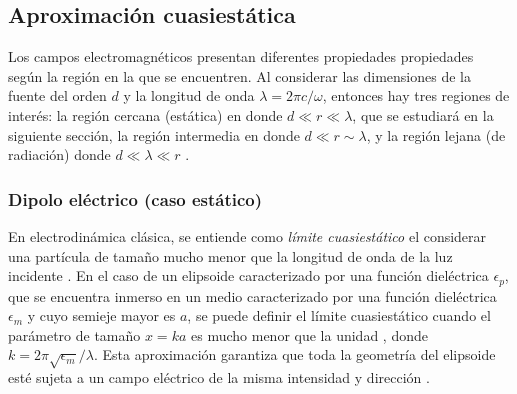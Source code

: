 \subsection{Aproximación cuasiestática}
Los campos electromagnéticos presentan diferentes propiedades propiedades según la región en la que se encuentren. Al considerar las dimensiones de la fuente  del orden $d$ y la longitud de onda $\lambda=2\pi c/\omega$, entonces hay tres regiones de interés: la región cercana (estática) en donde $d\ll r\ll\lambda$, que se estudiará en la siguiente sección, la región intermedia en donde $d\ll r\sim \lambda$, y la región lejana (de radiación) donde $d\ll \lambda\ll r$ \cite{Jackson}.
\subsubsection{Dipolo eléctrico (caso estático)}

En electrodinámica clásica, se entiende como \textit{límite cuasiestático} el considerar una partícula de tamaño mucho menor que la longitud de onda de la luz incidente \cite{Cuasiest}. En el caso de un elipsoide caracterizado por una función dieléctrica $\epsilon_p$, que se encuentra inmerso en un medio caracterizado por una función dieléctrica $\epsilon_m$ y cuyo semieje mayor es $a$, se puede definir el límite cuasiestático cuando el parámetro de tamaño $x=ka$ es mucho menor que la unidad \cite{Bohren}, donde $k=2\pi \sqrt{\epsilon_m}/\lambda$. Esta aproximación garantiza que toda la geometría del elipsoide esté sujeta a un campo eléctrico de la misma intensidad y dirección \cite{Miguel}.\\


